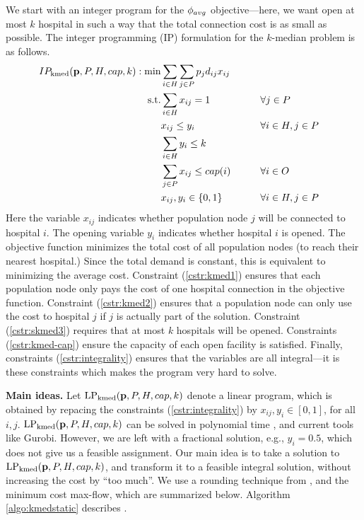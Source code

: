 We start with an integer program for the $\phi_{avg}$ objective---here,
we want open at most $k$ hospital in such a way that the total connection cost is as small as possible. 
The integer programming (IP) formulation for the $k$-median problem is as follows.
\begin{alignat}{2}  
  IP_{\text{kmed}}(\mathbf{p}, P, H, cap, k): \min  &  \sum_{i \in H}\sum_{j \in P} p_j d_{ij} x_{ij} \nonumber\\
    \text{s.t.} & \sum_{i \in H} x_{ij} = 1    &\qquad& \forall j \in P\label{cstr:kmed1} \\
                             &  x_{ij} \leq y_i      && \forall i \in H, j \in P \label{cstr:kmed2}\\
                             &  \sum_{i\in H} y_{i} \leq k      &&  \label{cstr:skmed3}\\
                             & \sum_{j \in P} x_{ij} \leq cap(i)      && \forall i \in O  \label{cstr:kmed-cap} \\
                             & x_{ij},  y_i \in \{0,1\} && \forall i \in H, j \in P \label{cstr:integrality}
\end{alignat}
Here the variable $x_{ij}$ indicates whether population node $j$ will be connected to hospital $i$. The opening variable $y_i$ indicates whether hospital $i$ is opened. The objective function minimizes the total cost of all population nodes (to reach their nearest hospital.) Since the total demand is constant, this is equivalent to minimizing the average cost. Constraint (\ref{cstr:kmed1}) ensures that each population node only pays the cost of one hospital connection in the objective function. Constraint (\ref{cstr:kmed2}) ensures that a population node can only use the cost to hospital $j$ if $j$ is actually part of the solution. Constraint (\ref{cstr:skmed3}) requires that at most $k$ hospitals will be opened.
Constraints (\ref{cstr:kmed-cap}) ensure the capacity of each open facility is satisfied.
Finally, constraints (\ref{cstr:integrality}) ensures that the variables are all integral---it is these constraints
which makes the program very hard to solve.

\noindent
\textbf{Main ideas.}
Let $\text{LP}_{\text{kmed}}(\mathbf{p}, P, H, cap, k)$ denote a linear program, which is obtained by repacing the constraints
(\ref{cstr:integrality}) by $x_{ij},  y_i \in [0,1]$, for all $i, j$.
$\text{LP}_{\text{kmed}}(\mathbf{p}, P, H, cap, k)$ can be solved in polynomial time \cite{gls:book}, and current tools like 
Gurobi.  However, we are left with a fractional solution, e.g., $y_i=0.5$, which does not 
give us a feasible assignment.
Our main idea is to take a solution to $\text{LP}_{\text{kmed}}(\mathbf{p}, P, H, cap, k)$, 
and transform it to a feasible integral solution,
without increasing the cost by ``too much''.
We use a rounding technique from \cite{srin:level-sets}, 
and the minimum cost max-flow, which are summarized below.
Algorithm \ref{algo:kmedstatic} describes \algokmedstatic{}.

